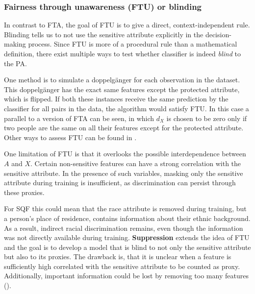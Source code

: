 \subsubsection*{Fairness through unawareness (FTU) or blinding}
In contrast to FTA, the goal of FTU is to give a direct, context-independent rule. Blinding tells us to not use the sensitive attribute explicitly in the decision-making process.
Since FTU is more of a procedural rule than a mathematical definition, there exist multiple ways to test whether classifier is indeed \textit{blind} to the PA.\par
One method is to simulate a doppelgänger for each observation in the dataset. This doppelgänger has the exact same features except the protected attribute, which is flipped.
If both these instances receive the same prediction by the classifier for all pairs in the data, the algorithm would satisfy FTU. In this case a parallel to a version of FTA can be seen, in which $d_X$ is chosen to be zero only if two people are the same on all their features except for the protected attribute. Other ways to assess FTU can be found in \cite{verma2018}.\par
One limitation of FTU is that it overlooks the possible interdependence between \( A \) and \( X \). Certain non-sensitive features can have a strong correlation with the sensitive attribute. In the presence of such variables, masking only the sensitive attribute during training is insufficient, as discrimination can persist through these proxies.\par
For SQF this could mean that the race attribute is removed during training, but a person's place of residence, contains information about their ethnic background. As a result, indirect racial discrimination remains, even though the information was not directly available during training.
\textbf{Suppression} extends the idea of FTU and the goal is to develop a model that is blind to not only the sensitive attribute but also to its proxies. The drawback is, that it is unclear when a feature is sufficiently high correlated with the sensitive attribute to be counted as proxy. Additionally, important information could be lost by removing too many features (\cite{castelnovo2022}).


